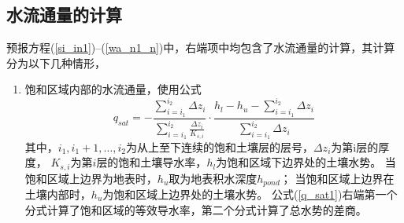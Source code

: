 \subsection{水流通量的计算}
预报方程(\ref{si_in1})--(\ref{wa_n1_n})中，右端项中均包含了水流通量的计算，其计算分为以下几种情形，
\begin{enumerate}
    \item 饱和区域内部的水流通量，使用公式
    \begin{equation}\label{q_sat1}
        q_{sat}=-\frac{\sum_{i=i_{1}}^{i_{2}} \Delta z_{i}}{\sum_{i=i_{1}}^{i_{2}} \frac{\Delta z_{i}}{K_{s, i}}}
         \cdot \frac{h_{l}-h_{u}-\sum_{i=i_{1}}^{i_{2}} \Delta z_{i}}{\sum_{i=i_{1}}^{i_{2}} \Delta z_{i}}
        \end{equation}
        其中，$i_1,i_1+1,…,i_2$为从上至下连续的饱和土壤层的层号，$\Delta z_i$为第i层的厚度，
        $K_{s,i}$为第$i$层的饱和土壤导水率，$h_l$为饱和区域下边界处的土壤水势。
        当饱和区域上边界为地表时，$h_u$取为地表积水深度$h_{pond}$；
        当饱和区域上边界在土壤内部时，$h_u$为饱和区域上边界处的土壤水势。
        公式(\ref{q_sat1})右端第一个分式计算了饱和区域的等效导水率，第二个分式计算了总水势的差商。


\end{enumerate}
